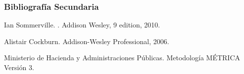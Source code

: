 \documentclass[animated,a4paper,slidestop,xcolor=pst,blue]{beamer}
\begin{document}
\begin{frame}
    \frametitle{Bibliografía Secundaria}
    \begin{thebibliography}{1}
Ian Sommerville.
.
\newblock Addison Wesley, 9 edition, 2010.


Alistair Cockburn.
\newblock Addison-Wesley Professional, 2006.


\bibitem{}
Ministerio de Hacienda y Administraciones Públicas.
\newblock Metodología MÉTRICA Versión 3.

\end{thebibliography}
\end{frame}
\end{document}
